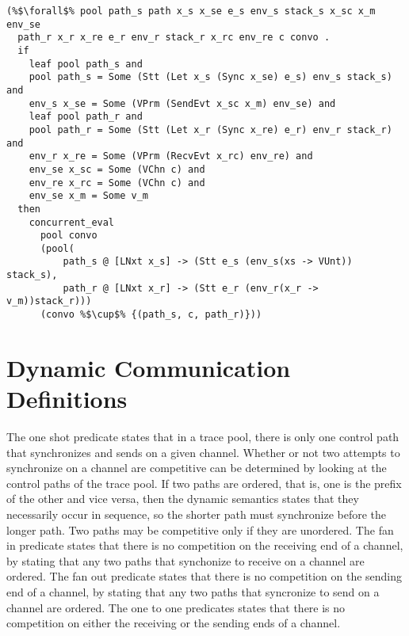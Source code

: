 \documentclass{article}
\begin{document}
\begin{lstlisting}[language=logic, escapechar=\%]
(%$\forall$% pool path_s path x_s x_se e_s env_s stack_s x_sc x_m env_se
  path_r x_r x_re e_r env_r stack_r x_rc env_re c convo .
  if 
    leaf pool path_s and
    pool path_s = Some (Stt (Let x_s (Sync x_se) e_s) env_s stack_s) and
    env_s x_se = Some (VPrm (SendEvt x_sc x_m) env_se) and
    leaf pool path_r and
    pool path_r = Some (Stt (Let x_r (Sync x_re) e_r) env_r stack_r) and
    env_r x_re = Some (VPrm (RecvEvt x_rc) env_re) and
    env_se x_sc = Some (VChn c) and
    env_re x_rc = Some (VChn c) and 
    env_se x_m = Some v_m
  then
    concurrent_eval
      pool convo
      (pool(
          path_s @ [LNxt x_s] -> (Stt e_s (env_s(xs -> VUnt)) stack_s), 
          path_r @ [LNxt x_r] -> (Stt e_r (env_r(x_r -> v_m))stack_r))) 
      (convo %$\cup$% {(path_s, c, path_r)}))

\end{lstlisting}

\section{Dynamic Communication Definitions}

The one shot predicate states that in a trace pool, there is only one control path that
synchronizes and sends on a given channel. Whether or not two attempts to synchronize on a
channel are competitive can be determined by
looking at the control paths of the trace pool. If two paths are ordered, that is, one is the
prefix of the other and vice versa, then the dynamic semantics states that they necessarily
occur in sequence, so the shorter path must synchronize before the longer path. Two paths may
be competitive only if they are unordered. The fan in predicate states that there is no
competition on the receiving end of a channel, by stating that any two paths that synchonize to
receive on a channel are ordered. The fan out predicate states that there is no competition on
the sending end of a channel, by stating that any two paths that syncronize to send on a
channel are ordered. The one to one predicates states that there is no competition on either
the receiving or the sending ends of a channel. 
\end{document}
